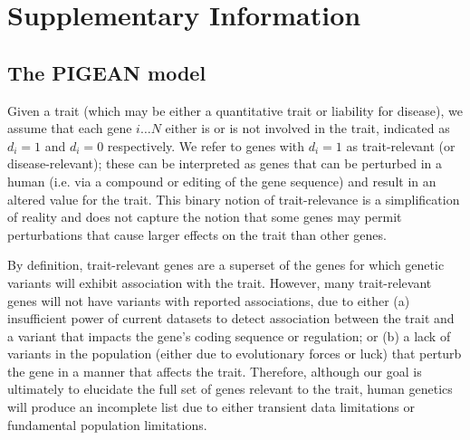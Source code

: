 \section{Supplementary Information}

\subsection{The PIGEAN model}

Given a trait (which may be either a quantitative trait or liability
for disease), we assume that each gene $i\ldots
N$ either is or is not involved in the trait, indicated as $d_i=1$ and
$d_i=0$ respectively. We refer to genes with $d_i=1$ as
trait-relevant (or disease-relevant); these can be interpreted as genes that can be
perturbed in a human (i.e. via a compound or editing of the
gene sequence) and result in an altered value for the trait. This binary notion of trait-relevance is
a simplification of reality and does not capture the notion that some
genes may permit perturbations that cause larger effects on the trait
than other genes.

By definition, trait-relevant genes are a superset of the genes for which genetic
variants will exhibit association with the trait. However, many
trait-relevant genes will not have variants with reported
associations, due to either (a) insufficient power of current datasets
to detect association between the trait and a variant that impacts the
gene's coding sequence or regulation; or (b) a lack of variants in
the population (either due to evolutionary forces or luck) that
perturb the gene in a manner that affects the trait. Therefore,
although our goal is
ultimately to elucidate the full set of genes relevant to the trait, human genetics will produce an incomplete list due to
either transient data limitations or fundamental population limitations.

